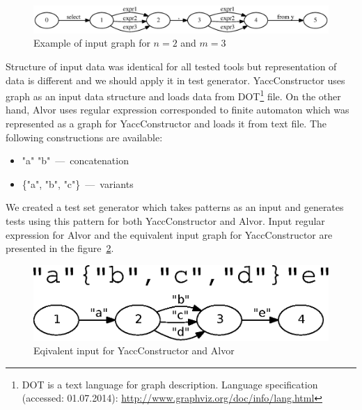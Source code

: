 \documentclass{sigplanconf}
\begin{document}
\begin{figure}[h!]
    \begin{center}
        \includegraphics[scale=0.35]{Graphs/x_10.eps}
    \end{center}
    \caption{Example of input graph for $n=2$ and $m=3$}
    \label{nmExample}
\end{figure}

Structure of input data was identical for all tested tools but representation of data is different and we should apply it in test generator. YaccConstructor uses graph as an input data structure and loads data from DOT\footnote{DOT is a text language for graph description. Language specification (accessed: 01.07.2014): \url{http://www.graphviz.org/doc/info/lang.html}} file. On the other hand, Alvor uses regular expression corresponded to finite automaton which was represented as a graph for YaccConstructor and loads it from text file. The following constructions are available:

\begin{itemize}
\item "a" "b"~---~concatenation
\item  \{"a", "b", "c"\}~---~variants
\end{itemize}

	We created a test set generator which takes patterns as an input and generates tests using this pattern for both YaccConstructor and Alvor. Input regular expression for Alvor and the equivalent input graph for YaccConstructor are presented in the figure~\ref{YCAlvor}.

\begin{figure}[h!]
    \begin{center}
        \includegraphics[scale=0.5]{Graphs/YcAlvorInput.eps}
    \end{center}
    \caption{Eqivalent input for YaccConstructor and Alvor}
    \label{YCAlvor}
\end{figure}
\end{document}
